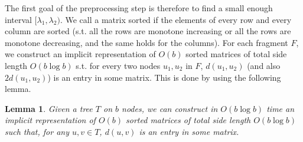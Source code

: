 \documentclass[11pt,a4paper]{article}
\newtheorem{lemma}{Lemma}
\theoremstyle{definition}
\theoremstyle{remark}
\begin{document}
The first goal of the preprocessing step is therefore to find a small enough interval $[\lambda_1,\lambda_2)$. We call a matrix sorted if the elements of every row and every column are sorted (s.t. all the rows are monotone increasing or all the rows are monotone decreasing, and the same holds for the columns).
For each fragment $F$, we construct an implicit representation of $O(b)$ sorted matrices of total side length $O(b\log b)$ s.t. for every two nodes $u_1,u_2$ in $F$, $d(u_1,u_2)$ (and also $2d(u_1,u_2)$) is an entry in some matrix. This is done by using the following lemma. 
\begin{lemma}
Given a tree $T$ on $b$ nodes, we can construct in $O(b\log b)$ time an implicit representation of $O(b)$ sorted matrices of total
side length $O(b\log b)$ such that, for any $u,v\in T$, $d(u,v)$ is an entry in some matrix.
\end{lemma}
\end{document}
